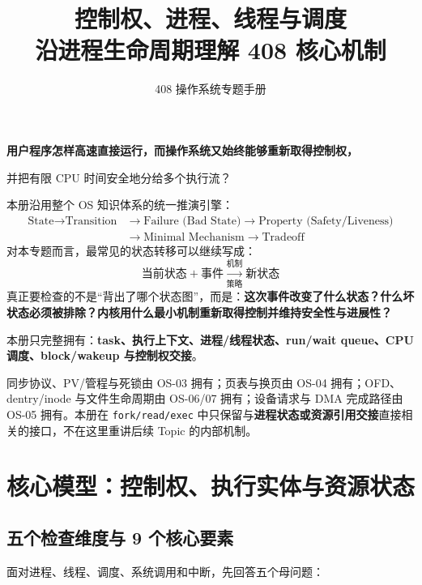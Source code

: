 \documentclass[11pt,a4paper]{ctexart}
\title{\vspace{-1.2cm}\textbf{控制权、进程、线程与调度}\\[0.4em]
\large 沿进程生命周期理解 408 核心机制}
\author{408 操作系统专题手册}
\date{}
\newcommand{\kw}[1]{\textbf{#1}}
\newcommand{\code}[1]{\texttt{#1}}
\begin{document}
\maketitle
\begin{corebox}[核心问题]

\begin{center}
\Large\bfseries 用户程序怎样高速直接运行，而操作系统又始终能够重新取得控制权，\par
并把有限 CPU 时间安全地分给多个执行流？
\end{center}

本册沿用整个 OS 知识体系的统一推演引擎：
\[
\boxed{
\begin{aligned}
\text{State} \rightarrow \text{Transition} &\rightarrow \text{Failure (Bad State)} \rightarrow \text{Property (Safety/Liveness)}\\
&\rightarrow \text{Minimal Mechanism} \rightarrow \text{Tradeoff}
\end{aligned}
}
\]
对本专题而言，最常见的状态转移可以继续写成：
\[
\boxed{\text{当前状态}+\text{事件}\xrightarrow[\text{策略}]{\text{机制}}\text{新状态}}
\]
真正要检查的不是“背出了哪个状态图”，而是：\kw{这次事件改变了什么状态？什么坏状态必须被排除？内核用什么最小机制重新取得控制并维持安全性与进展性？}
\end{corebox}

\begin{method}
本册只完整拥有：\kw{task、执行上下文、进程/线程状态、run/wait queue、CPU 调度、block/wakeup 与控制权交接}。

同步协议、PV/管程与死锁由 OS-03 拥有；页表与换页由 OS-04 拥有；OFD、dentry/inode 与文件生命周期由 OS-06/07 拥有；设备请求与 DMA 完成路径由 OS-05 拥有。本册在 \code{fork/read/exec} 中只保留与\kw{进程状态或资源引用交接}直接相关的接口，不在这里重讲后续 Topic 的内部机制。
\end{method}

\tableofcontents
\newpage

\section{核心模型：控制权、执行实体与资源状态}

\subsection{五个检查维度与 9 个核心要素}

面对进程、线程、调度、系统调用和中断，先回答五个母问题：
\end{document}
